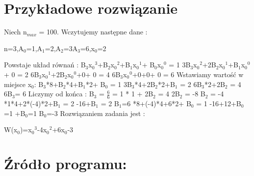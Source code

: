 \documentclass[11pt]{article}
\begin{document}
\section{Przykładowe rozwiązanie}
Niech n$_{max}$ = 100. Wczytujemy następne dane : \newline
\centerline{n=3,A$_{0}$=1,A$_{1}$=2,A$_{2}$=3A$_{3}$=6,x$_{0}$=2}
\newline \newline Powstaje układ równań : \newline 
B$_{3}$x$_{0}$$^{3}$+B$_{2}$x$_{0}$$^{2}$+B$_{1}$x$_{0}$$^{1}$+ B$_{0}$x$_{0}$$^{0}$ = 1 \newline
3B$_{3}$x$_{0}$$^{2}$+2B$_{2}$x$_{0}$$^{1}$+B$_{1}$x$_{0}$$^{0}$+ 0 = 2 \newline 
6B$_{3}$x$_{0}$$^{1}$+2B$_{2}$x$_{0}$$^{0}$+0+ 0 = 4 \newline
6B$_{3}$x$_{0}$$^{0}$+0+0+ 0 = 6 \newline \newline 
Wstawiamy wartość w miejsce x$_{0}$: \newline
B$_{3}$*8+B$_{2}$*4+B$_{1}$*2+ B$_{0}$ = 1 \newline
3B$_{3}$*4+2B$_{2}$*2+B$_{1}$ = 2 \newline 
6B$_{3}$*2+2B$_{2}$ = 4 \newline
6B$_{3}$= 6 \newline \newline 
Liczymy od końca : \newline
B$_{3}$ = $\frac {6}{6}$ = 1  * 1 + 2B$_{2}$ = 4 \newline
2B$_{2}$ = -8 \newline
B$_{2}$ = -4 *1*4+2*(-4)*2+B$_{1}$ = 2 -16+B$_{1}$ = 2 \newline
B$_{1}$=6 *8+(-4)*4+6*2+ B$_{0}$ = 1 -16+12+B$_{0}$=1 +B$_{0}$=1 \newline
B$_{0}$=-3 \newline
\newline
Rozwiązaniem zadania jest : \newline
\centerline {W(x$_{0}$)=x$_{0}$$^{3}$-4x$_{0}$$^{2}$+6x$_{0}$-3}

\clearpage

\section{Źródło programu:}
\end{document}
